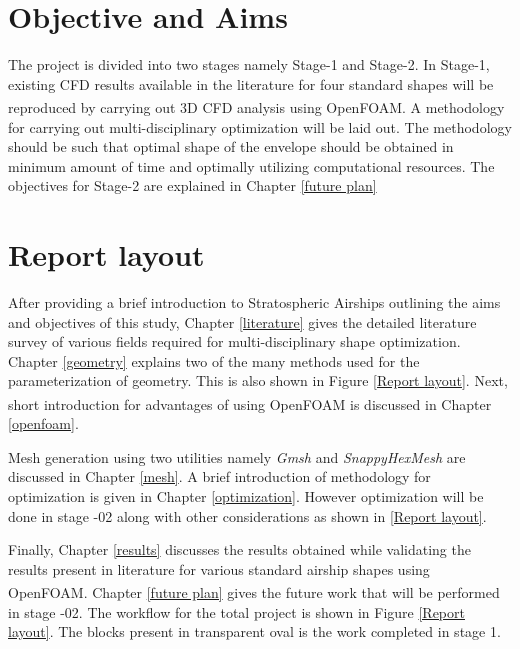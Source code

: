 \section{Objective and Aims}
The project is divided into two stages namely Stage-1 and Stage-2. In Stage-1, existing CFD results available in the literature for four standard shapes will be reproduced by carrying out 3D CFD analysis using OpenFOAM\textsuperscript{\textregistered}. A methodology for carrying out multi-disciplinary optimization will be laid out. The methodology should be such that optimal shape of the envelope should be obtained in minimum amount of time and optimally utilizing computational resources. The objectives for Stage-2 are explained in Chapter \ref{future plan}

\section{Report layout}
\label{layout}

After providing a brief introduction to Stratospheric Airships outlining the aims and objectives of this study, Chapter \ref{literature} gives the detailed literature survey of various fields required for multi-disciplinary shape optimization. Chapter \ref{geometry}  explains two of the many methods used for the parameterization of geometry. This is also shown in Figure \ref{Report layout}. Next, short introduction for advantages of using OpenFOAM\textsuperscript{\textregistered} is discussed in Chapter \ref{openfoam}. 

Mesh generation using two utilities namely \textit{Gmsh} and \textit{SnappyHexMesh} are discussed in Chapter \ref{mesh}. A brief introduction of methodology for optimization is given in Chapter \ref{optimization}. However optimization will be done in stage -02 along with other considerations as shown in \ref{Report layout}. 

Finally, Chapter \ref{results} discusses the results obtained while validating the results present in literature for various standard airship shapes using OpenFOAM\textsuperscript{\textregistered}. Chapter \ref{future plan} gives the future work that will be performed in stage -02. The workflow for the total project is shown in Figure \ref{Report layout}. The blocks present in transparent oval is the work completed in stage 1. 

